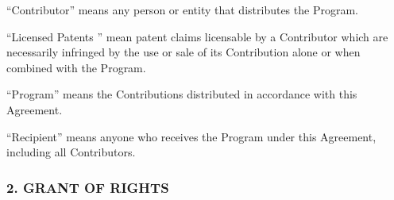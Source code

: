 ``Contributor'' means any person or entity that distributes the Program.

``Licensed Patents '' mean patent claims licensable
by a Contributor which are necessarily infringed by the use or sale of
its Contribution alone or when combined with the Program. 





``Program'' means the Contributions distributed in accordance with this Agreement.





``Recipient'' means anyone who receives the Program under this Agreement, including all Contributors.


\subsubsection*{2.  GRANT OF RIGHTS}

